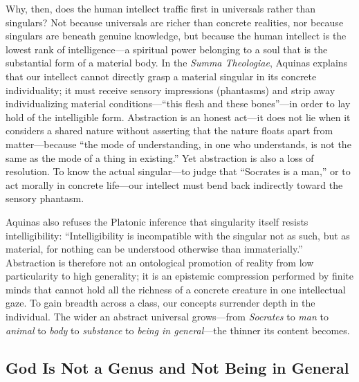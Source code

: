 Why, then, does the human intellect traffic first in universals rather than singulars? Not because universals are richer than concrete realities, nor because singulars are beneath genuine knowledge, but because the human intellect is the lowest rank of intelligence---a spiritual power belonging to a soul that is the substantial form of a material body. In the \textit{Summa Theologiae}, Aquinas explains that our intellect cannot directly grasp a material singular in its concrete individuality; it must receive sensory impressions (phantasms) and strip away individualizing material conditions---``this flesh and these bones''---in order to lay hold of the intelligible form. Abstraction is an honest act---it does not lie when it considers a shared nature without asserting that the nature floats apart from matter---because ``the mode of understanding, in one who understands, is not the same as the mode of a thing in existing.'' Yet abstraction is also a loss of resolution. To know the actual singular---to judge that ``Socrates is a man,'' or to act morally in concrete life---our intellect must bend back indirectly toward the sensory phantasm.

Aquinas also refuses the Platonic inference that singularity itself resists intelligibility: ``Intelligibility is incompatible with the singular not as such, but as material, for nothing can be understood otherwise than immaterially.'' Abstraction is therefore not an ontological promotion of reality from low particularity to high generality; it is an epistemic compression performed by finite minds that cannot hold all the richness of a concrete creature in one intellectual gaze. To gain breadth across a class, our concepts surrender depth in the individual. The wider an abstract universal grows---from \textit{Socrates} to \textit{man} to \textit{animal} to \textit{body} to \textit{substance} to \textit{being in general}---the thinner its content becomes.

\subsection{God Is Not a Genus and Not Being in General}

